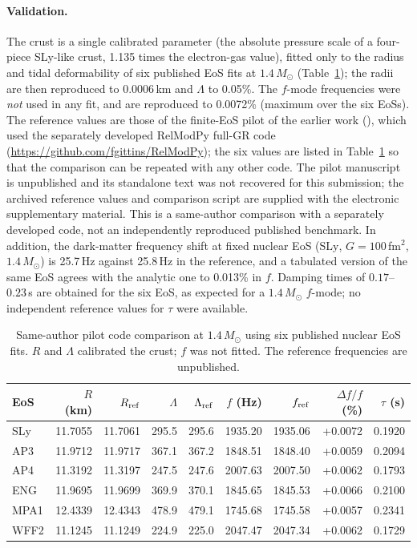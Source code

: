 \documentclass[11pt,a4paper]{article}
\newcommand{\Msun}{M_\odot}
\begin{document}
\paragraph{Validation.} The crust is a single calibrated parameter (the absolute pressure scale of a four-piece SLy-like crust, 1.135 times the electron-gas value), fitted only to the radius and tidal deformability of six published EoS fits at $1.4\,\Msun$ (Table~\ref{tab:valid}); the radii are then reproduced to 0.0006\,km and $\Lambda$ to 0.05\%. The $f$-mode frequencies were \emph{not} used in any fit, and are reproduced to 0.0072\% (maximum over the six EoSs). The reference values are those of the finite-EoS pilot of the earlier work (\citealt{HusainPilot}), which used the separately developed RelModPy full-GR code (\url{https://github.com/fgittins/RelModPy}); the six values are listed in Table~\ref{tab:valid} so that the comparison can be repeated with any other code. The pilot manuscript is unpublished and its standalone text was not recovered for this submission; the archived reference values and comparison script are supplied with the electronic supplementary material. This is a same-author comparison with a separately developed code, not an independently reproduced published benchmark. In addition, the dark-matter frequency shift at fixed nuclear EoS ($\mathrm{SLy}$, $G=100$\,fm$^2$, $1.4\,\Msun$) is 25.7\,Hz against 25.8\,Hz in the reference, and a tabulated version of the same EoS agrees with the analytic one to 0.013\% in $f$. Damping times of $0.17$--$0.23$\,s are obtained for the six EoS, as expected for a $1.4\,\Msun$ $f$-mode; no independent reference values for $\tau$ were available.
\begin{table}[htbp]\centering\small
\caption{Same-author pilot code comparison at $1.4\,\Msun$ using six published nuclear EoS fits. $R$ and $\Lambda$ calibrated the crust; $f$ was not fitted. The reference frequencies are unpublished.}\label{tab:valid}
\begin{tabular}{lrrrrrrrr}\toprule
EoS & $R$ (km) & $R_{\rm ref}$ & $\Lambda$ & $\Lambda_{\rm ref}$ & $f$ (Hz) & $f_{\rm ref}$ & $\Delta f/f$ (\%) & $\tau$ (s)\\\midrule
SLy & 11.7055 & 11.7061 & 295.5 & 295.6 & 1935.20 & 1935.06 & +0.0072 & 0.1920 \\
AP3 & 11.9712 & 11.9717 & 367.1 & 367.2 & 1848.51 & 1848.40 & +0.0059 & 0.2094 \\
AP4 & 11.3192 & 11.3197 & 247.5 & 247.6 & 2007.63 & 2007.50 & +0.0062 & 0.1793 \\
ENG & 11.9695 & 11.9699 & 369.9 & 370.1 & 1845.65 & 1845.53 & +0.0066 & 0.2100 \\
MPA1 & 12.4339 & 12.4343 & 478.9 & 479.1 & 1745.68 & 1745.58 & +0.0057 & 0.2341 \\
WFF2 & 11.1245 & 11.1249 & 224.9 & 225.0 & 2047.47 & 2047.34 & +0.0062 & 0.1729
\\\bottomrule\end{tabular}\end{table}
\end{document}
